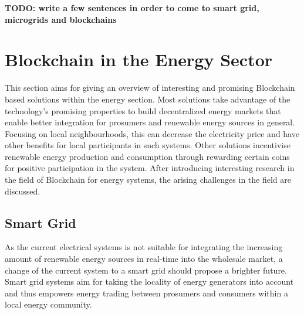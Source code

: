 \documentclass[runningheads]{llncs}
\begin{document}
\textbf{TODO: write a few sentences in order to come to smart grid, microgrids and blockchains}


\section{Blockchain in the Energy Sector}
This section aims for giving an overview of interesting and promising Blockchain based solutions within the energy section. Most solutions take advantage of the technology's promising properties to build decentralized energy markets that enable better integration for prosumers and renewable energy sources in general. Focusing on local neighbourhoods, this can decrease the electricity price and have other benefits for local participants in such systems. Other solutions incentivise renewable energy production and consumption through rewarding certain coins for positive participation in the system. After introducing interesting research in the field of Blockchain for energy systems, the arising challenges in the field are discussed.

\subsection{Smart Grid}
As the current electrical systems is not suitable for integrating the increasing amount of renewable energy sources in real-time into the wholesale market, a change of the current system to a smart grid should propose a brighter future. Smart grid systems aim for taking the locality of energy generators into account and thus empowers energy trading between prosumers and consumers within a local energy community. \cite{mengelkamp_lem}
\end{document}
